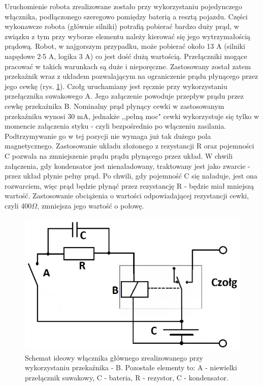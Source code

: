 Uruchomienie robota zrealizowane zostało przy wykorzystaniu pojedynczego włącznika, podłączonego szeregowo pomiędzy baterią a resztą pojazdu. Części wykonawcze robota (głównie silniki) potrafią pobierać bardzo duży prąd, w związku z tym przy wyborze elementu należy kierować się jego wytrzymałością prądową. Robot, w najgorszym przypadku, może pobierać około 13 A (silniki napędowe 2$\cdot$5 A, logika 3 A) co jest dość dużą wartością. Przełączniki mogące pracować w takich warunkach są duże i nieporęczne. Zastosowany został zatem przekaźnik wraz z układem pozwalającym na ograniczenie prądu płynącego przez jego cewkę (rys. \ref{wyla}). Czołg uruchamiany jest ręcznie przy wykorzystaniu przełącznika suwakowego A. Jego załączenie powoduje przepływ prądu przez cewkę przekaźnika B. Nominalny prąd płynący cewki w zastosowanym przekaźniku wynosi 30 mA, jednakże ,,pełną moc" cewki wykorzystuje się tylko w momencie załączenia styku - czyli bezpośrednio po włączeniu zasilania. Podtrzymywanie go w tej pozycji nie wymaga już tak dużego pola magnetycznego. Zastosowanie układu złożonego z rezystancji R oraz pojemności C pozwala na zmniejszenie prądu prądu płynącego przez układ. W chwili załączenia, gdy kondensator jest nienaładowany, traktowany jest jako zwarcie - przez układ płynie pełny prąd. Po chwili, gdy pojemność C się naładuje, jest ona rozwarciem, więc prąd będzie płynąć przez rezystancję R - będzie miał mniejszą wartość. Zastosowanie obciążenia o wartości odpowiadającej rezystancji cewki, czyli 400$\Omega$, zmniejsza jego wartość o połowę.

  \begin{figure}[H]
    \begin{center}
      \includegraphics[scale=0.35]{imgs/wylaczniik.png}
 	\caption[Wyłącznik główny.]{\small{Schemat ideowy włącznika głównego zrealizowanego przy wykorzystaniu przekaźnika - B. Pozostałe elementy to: A - niewielki przełącznik suwakowy, C - bateria, R - rezystor, C - kondensator.}}
	\label{wyla}
    \end{center}
  \end{figure}   
  
